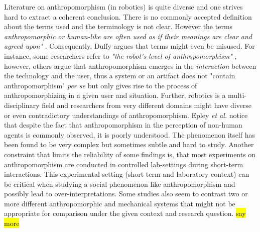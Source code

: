 \documentclass[twocolumn]{svjour3}          %
\begin{document}
	Literature on anthropomorphism (in robotics) is quite diverse and one strives hard to extract a coherent conclusion. There is no commonly accepted definition about the terms used and the terminology is not clear. However the terms \textit{anthropomorphic or human-like are often used as if their meanings are clear and agreed upon"} \cite{persson_anthropomorphism_2000}. Consequently, Duffy \cite{duffy_anthropomorphism_2002} argues that terms might even be misused. For instance, some researchers refer to \textit{"the robot's level of anthropomorphism"} \cite{bartneck_is_2007}, however, others argue that anthropomorphism emerges in the \textit{interaction} between the technology and the user, thus a system or an artifact does not "contain anthropomorphism" \textit{per se} \cite{persson_anthropomorphism_2000} but only gives rise to the process of anthropomorphizing in a given user and situation. Further, robotics is a multi-disciplinary field and researchers from very different domains might have diverse or even contradictory understandings of anthropomorphism. Epley \textit{et al.} \cite{epley_seeing_2007} notice that despite the fact that anthropomorphism in the perception of non-human agents is commonly observed, it is poorly understood. The phenomenon itself has been found to be very complex but sometimes subtle and hard to study. Another constraint that limits the reliability of some findings is, that most experiments on anthropomorphism are conducted in controlled lab-settings during short-term interactions. This experimental setting (short term and laboratory context) can be critical when studying a social phenomenon like anthropomorphism and possibly lead to over-interpretations. Some studies also seem to contrast two or more different anthropomorphic and mechanical systems that might not be appropriate for comparison under the given context and research question. \hl{say more}
	
\end{document}
